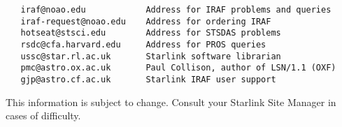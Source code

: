 \begin{verbatim}
   iraf@noao.edu            Address for IRAF problems and queries 
   iraf-request@noao.edu    Address for ordering IRAF 
   hotseat@stsci.edu        Address for STSDAS problems 
   rsdc@cfa.harvard.edu     Address for PROS queries  
   ussc@star.rl.ac.uk       Starlink software librarian  
   pmc@astro.ox.ac.uk       Paul Collison, author of LSN/1.1 (OXF) 
   gjp@astro.cf.ac.uk       Starlink IRAF user support
\end{verbatim}

This information is subject to change.  Consult your Starlink Site
Manager in cases of difficulty.


